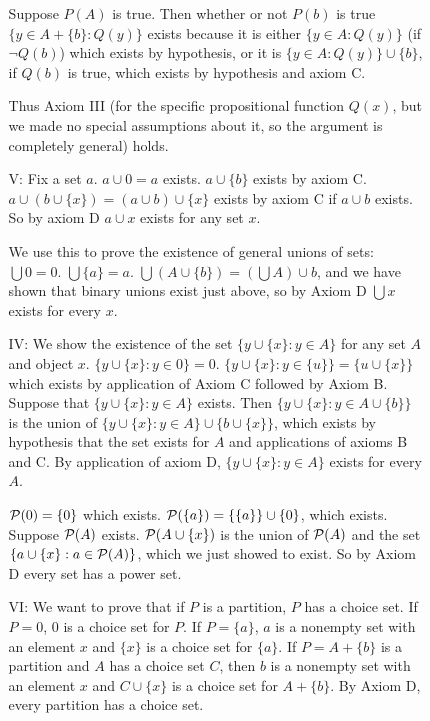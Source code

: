 \documentclass[12pt]{article}
\begin{document}
\begin{enumerate}
\begin{description}
\begin{enumerate}
Suppose $P(A)$ is true.  Then whether or not $P(b)$ is true $\{y \in A + \{b\}:Q(y)\}$ exists because it is either $\{y \in A:Q(y)\}$ (if $\neg Q(b)$) which
exists by hypothesis, or it is $\{y \in A:Q(y)\} \cup \{b\}$, if $Q(b)$ is true, which exists by hypothesis and axiom C.

Thus Axiom III (for the specific propositional function $Q(x)$, but we made no special assumptions about it, so the argument is completely general) holds.

\item[V:]  Fix a set $a$.  $a \cup 0 = a$ exists.  $a \cup \{b\}$ exists by axiom C.  $a \cup (b \cup \{x\}) = (a\cup b) \cup \{x\}$ exists by axiom C if $a \cup b$ exists.  So by axiom D
$a \cup x$ exists for any set $x$.  

We use this to prove the existence of general unions of sets:
$\bigcup 0=0$.  $\bigcup \{a\} = a$.  $\bigcup (A \cup \{b\}) = (\bigcup A) \cup b$, and we have shown that binary unions exist just above, so by Axiom D $\bigcup x$ exists for every $x$.

\item[IV:]  We show the existence of the set $\{y \cup \{x\}:y \in A\}$ for any set $A$ and object $x$.  $\{y \cup \{x\}:y \in 0\} = 0$.
$\{y \cup \{x\}:y \in \{u\}\} = \{u \cup \{x\}\}$ which exists by application of Axiom C followed by Axiom B.  Suppose that $\{y \cup \{x\}:y \in A\}$ exists. Then $\{y \cup \{x\}:y \in A \cup \{b\}\}$ is the union of
$\{y \cup \{x\}:y \in A\} \cup \{b \cup \{x\}\}$, which exists by hypothesis that the set exists for $A$ and applications of axioms B and C.  By application of axiom D, $\{y \cup \{x\}:y \in A\}$ exists for every $A$.

${\cal P}(0) = \{0\}$ which exists.  ${\cal P}(\{a\}) = \{\{a\}\} \cup \{0\}$, which exists.  Suppose ${\cal P}(A)$ exists.  ${\cal P}(A \cup \{x\})$  is the union of ${\cal P}(A)$ and the set $\{a \cup \{x\}:a \in {\cal P}(A)\}$, which we just showed to exist.  So by Axiom D every set has a power set.

\item[VI:]  We want to prove that if $P$ is a partition, $P$ has a choice set.  If $P=0$, 0 is a choice set for $P$.  If $P= \{a\}$, $a$ is a nonempty set with an element $x$
and $\{x\}$ is a choice set for $\{a\}$.  If $P = A + \{b\}$ is a partition and $A$ has a choice set $C$, then $b$ is a nonempty set with an element $x$ and $C \cup \{x\}$ is a choice set for $A+\{b\}$.  By Axiom D, every partition has a choice set.


\end{enumerate}
\end{description}
\end{enumerate}
\end{document}
